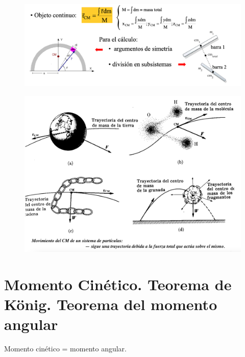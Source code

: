 \begin{figure}[H]
	\centering
	\includegraphics[width=1\textwidth]{imagenes/imagenes12/T12IM02.png}
\end{figure}

\begin{figure}[H]
	\centering
	\includegraphics[width=1\textwidth]{imagenes/imagenes12/T12IM05.png}
\end{figure}



\section[Momento Cinético. Teorema de König. Teorema del momento angular]{Momento Cinético. Teorema de König. Teorema del momento angular}

\textcolor{gris}{ \textsf{ \small{Momento cinético = momento angular}\normalsize{.} } }

